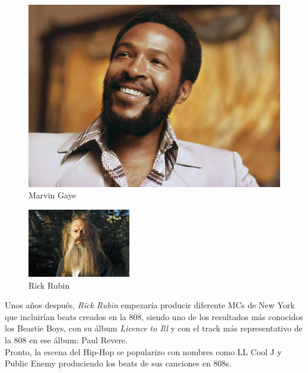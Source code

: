 \documentclass{article}
\begin{document}
\endgroup

\begin{figure}[h]
    \begin{center}
        \includegraphics[scale=0.2]{images/marvin.jpg}
    \end{center}
    \vspace{-5pt}
    \caption{Marvin Gaye}
\end{figure}

\begingroup
\setlength{\intextsep}{0pt}%
\setlength{\columnsep}{0pt}%

\begin{figure}
    \centering
    \includegraphics[width=0.4\textwidth]{images/rubin.jpg}
    \vspace{-5pt}
    \caption{Rick Rubin}
\end{figure}

Unos años después, \emph{Rick Rubin} empezaría producir diferente MCs de New York que incluirían beats creados en la 808, siendo uno de los resultados más conocidos los Beastie Boys, con su álbum \emph{Licence to Ill} y con el track más representativo de la 808 en ese álbum: Paul Revere.\cite{808film}\\

Pronto, la escena del Hip-Hop se popularizo con nombres como LL Cool J y Public Enemy produciendo los beats de sus canciones en 808s.\cite{808film}\\
\end{document}
